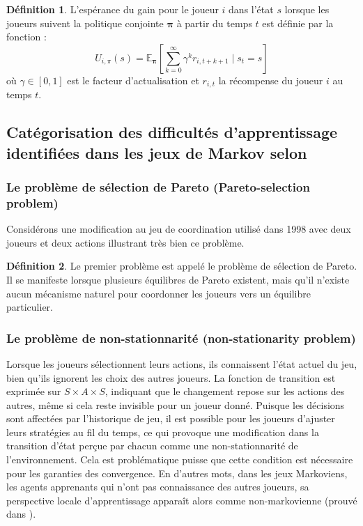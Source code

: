 \documentclass{article}
\theoremstyle{definition}
\newtheorem{definition}{Définition}
\begin{document}
\begin{definition}
L'espérance du gain pour le joueur $i$ dans l'état $s$ lorsque les joueurs suivent la politique conjointe $\bm{\pi}$ à partir du temps $t$ est définie par la fonction :
\[
U_{i,\pi}(s) = \mathbb{E}_{\bm{\pi}} \left[ \sum_{k=0}^{\infty} \gamma^{k} r_{i,t+k+1} \mid s_{t} = s \right]
\]
où $\gamma \in [0,1]$ est le facteur d'actualisation et $r_{i,t}$ la récompense du joueur $i$ au temps $t$.
\end{definition}






\subsection{Catégorisation des difficultés d'apprentissage identifiées dans les jeux de Markov selon \citet{matignon_independent_2012}}

\subsubsection{Le problème de sélection de Pareto (Pareto-selection problem)}

Considérons une modification au jeu de coordination utilisé dans \citet{claus_dynamics_nodate} 1998 avec deux joueurs et deux actions illustrant très bien ce problème.

\begin{definition}
    Le premier problème est appelé le problème de sélection de Pareto. Il se manifeste lorsque plusieurs équilibres de Pareto existent, mais qu'il n'existe aucun mécanisme naturel pour coordonner les joueurs vers un équilibre particulier. 
\end{definition}

\subsubsection{Le problème de non-stationnarité (non-stationarity problem)}

Lorsque les joueurs sélectionnent leurs actions, ils connaissent l'état actuel du jeu, bien qu'ils ignorent les choix des autres joueurs. La fonction de transition est exprimée sur $S \times A \times S$, indiquant que le changement repose sur les actions des autres, même si cela reste invisible pour un joueur donné. Puisque les décisions sont affectées par l'historique de jeu, il est possible pour les joueurs d'ajuster leurs stratégies au fil du temps, ce qui provoque une modification dans la transition d'état perçue par chacun comme une non-stationnarité de l'environnement. Cela est problématique puisse que cette condition est nécessaire pour les garanties des convergence. En d'autres mots, dans les jeux Markoviens, les agents apprenants qui n'ont pas connaissance des autres joueurs, sa perspective locale d'apprentissage apparaît alors comme non-markovienne (prouvé dans \citet{laurent_world_2011}).
\end{document}
